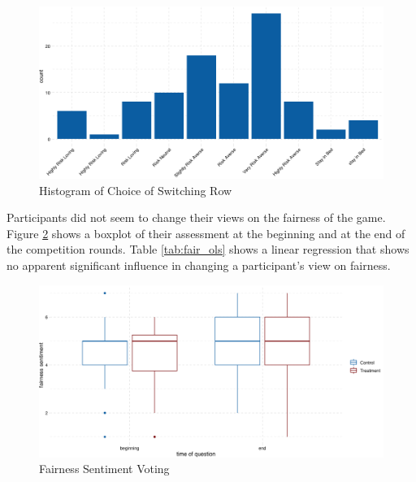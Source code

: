 \begin{figure}
    \centering
    \includegraphics[width=\textwidth]{graphs/hist_mpl.png}
    \caption{Histogram of Choice of Switching Row}
    \label{fig:hist_mpl}
\end{figure}


Participants did not seem to change their views on the fairness of the game. Figure \ref{fig:fairness_boxplot} shows a boxplot of their assessment at the beginning and at the end of the competition rounds. Table \ref{tab:fair_ols} shows a linear regression that shows no apparent significant influence in changing a participant's view on fairness.\\

\begin{figure}
    \centering
    \includegraphics[width=\textwidth]{graphs/fairness_sentiment_boxplot.png}
    \caption{Fairness Sentiment Voting}
    \label{fig:fairness_boxplot}
\end{figure}



